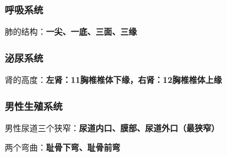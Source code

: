 \subsubsection{呼吸系统}%
\label{ssub:复习：呼吸系统}
\begin{notation}
    肺的结构：\textbf{一尖、一底、三面、三缘}
\end{notation}
\subsubsection{泌尿系统}%
\label{subsub:复习：泌尿系统}
\begin{notation}
肾的高度：\textbf{左肾：11胸椎椎体下缘，右肾：12胸椎椎体上缘}
\end{notation}
\subsubsection{男性生殖系统}%
\label{ssub:复习：男性生殖系统}
\begin{notation}
男性尿道三个狭窄：\textbf{尿道内口、膜部、尿道外口（最狭窄）}

两个弯曲：\textbf{耻骨下弯、耻骨前弯}
\end{notation}
